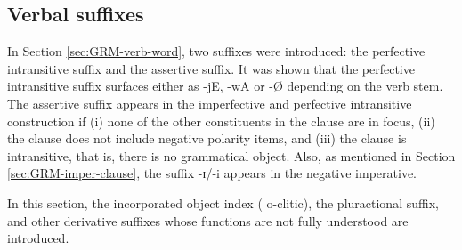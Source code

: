 \begin{exe}
\begin{exe}
\begin{exe}
{\begin{exe}
\begin{exe}
\begin{exe}
\begin{exe}
\begin{exe}
\begin{exe}
\begin{exe}
\begin{exe}
\begin{exe}
\begin{exe}
\begin{exe}
\begin{exe}
\begin{exe}
\begin{exe}
\begin{exe}
\begin{exe}
\begin{exe}
\begin{exe}
\begin{exe}
\begin{exe}
\begin{exe}



\subsection{Verbal suffixes}
\label{sec:GRM-verb-suffix}


In Section \ref{sec:GRM-verb-word}, two suffixes were introduced: the 
perfective 
intransitive suffix and the assertive suffix. It was shown that the perfective 
intransitive suffix surfaces either as {\sls -jE}, {\sls -wA} or {\sls  -\O} 
depending 
on  the verb stem.  The assertive suffix appears  in the imperfective and 
perfective  intransitive construction if  (i) none of the other constituents in 
the clause are in focus, (ii) the clause does not include negative polarity 
items, and (iii) the clause is intransitive, that is, there is no grammatical 
object. Also,  as mentioned in Section \ref{sec:GRM-imper-clause},  the suffix 
{\sls -ɪ}/{\sls -i} appears in the negative imperative. 

In this section,  the incorporated object index  ({\sc
o}-clitic), the pluractional  suffix, and  other derivative suffixes whose
functions are not fully understood are introduced.



\end{exe}
\end{exe}
\end{exe}
\end{exe}
\end{exe}
\end{exe}
\end{exe}
\end{exe}
\end{exe}
\end{exe}
\end{exe}
\end{exe}
\end{exe}
\end{exe}
\end{exe}
\end{exe}
\end{exe}
\end{exe}
\end{exe}
\end{exe}
\end{exe}}
\end{exe}
\end{exe}
\end{exe}
